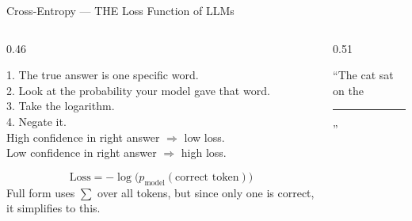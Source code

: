 \begin{frame}[shrink=4]{Cross-Entropy --- THE Loss Function of LLMs}

  \begin{columns}[T]
    \begin{column}{0.46\textwidth}
      \begin{tcolorbox}[colback=aiViolet!5, colframe=aiViolet!60,
        fonttitle=\bfseries\small, title={Recipe: Cross-Entropy Loss},
        rounded corners, boxrule=0.5pt, left=3pt, right=3pt, top=3pt, bottom=3pt]
        \footnotesize
        1. The true answer is one specific word.\\
        2. Look at the probability your model gave that word.\\
        3. Take the logarithm.\\
        4. Negate it.\\[3pt]
        High confidence in right answer \(\Rightarrow\) low loss.\\
        Low confidence in right answer \(\Rightarrow\) high loss.
      \end{tcolorbox}

      \vspace{0.3em}
      \begin{tcolorbox}[colback=gray!5, colframe=gray!40,
        fonttitle=\bfseries\small, title={Formal},
        rounded corners, boxrule=0.5pt, left=3pt, right=3pt, top=1pt, bottom=1pt]
        \footnotesize
        \[\text{Loss} = -\log\bigl(p_{\text{model}}(\text{correct token})\bigr)\]
        {\scriptsize Full form uses $\sum$ over all tokens, but since
        only one is correct, it simplifies to this.}
      \end{tcolorbox}
    \end{column}

    \begin{column}{0.51\textwidth}
      {\footnotesize ``The cat sat on the \rule{0.8cm}{0.4pt}''}


\end{column}
\end{columns}
\end{frame}
